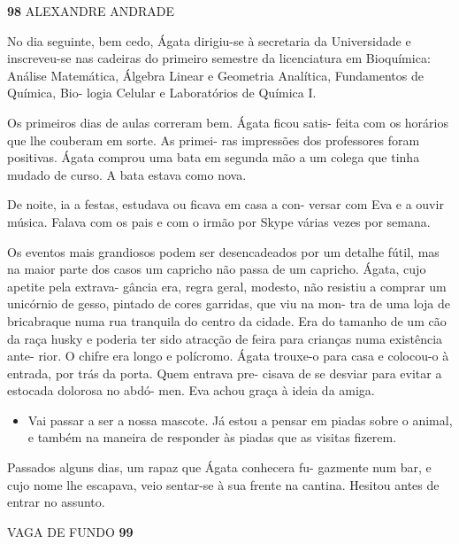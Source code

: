 \textbf{98 }ALEXANDRE ANDRADE

No dia seguinte, bem cedo, Ágata dirigiu-se à secretaria da Universidade
e inscreveu-se nas cadeiras do primeiro semestre da licenciatura em
Bioquímica: Análise Matemática, Álgebra Linear e Geometria Analítica,
Fundamentos de Química, Bio- logia Celular e Laboratórios de Química I.

Os primeiros dias de aulas correram bem. Ágata ficou satis- feita com os
horários que lhe couberam em sorte. As primei- ras impressões dos
professores foram positivas. Ágata comprou uma bata em segunda mão a um
colega que tinha mudado de curso. A bata estava como nova.

De noite, ia a festas, estudava ou ficava em casa a con- versar com Eva
e a ouvir música. Falava com os pais e com o irmão por Skype várias
vezes por semana.

Os eventos mais grandiosos podem ser desencadeados por um detalhe fútil,
mas na maior parte dos casos um capricho não passa de um capricho.
Ágata, cujo apetite pela extrava- gância era, regra geral, modesto, não
resistiu a comprar um unicórnio de gesso, pintado de cores garridas, que
viu na mon- tra de uma loja de bricabraque numa rua tranquila do centro
da cidade. Era do tamanho de um cão da raça husky e poderia ter sido
atracção de feira para crianças numa existência ante- rior. O chifre era
longo e polícromo. Ágata trouxe-o para casa e colocou-o à entrada, por
trás da porta. Quem entrava pre- cisava de se desviar para evitar a
estocada dolorosa no abdó- men. Eva achou graça à ideia da amiga.

\begin{itemize}
\tightlist
\item
  Vai passar a ser a nossa mascote. Já estou a pensar em piadas sobre o
  animal, e também na maneira de responder às piadas que as visitas
  fizerem.
\end{itemize}

Passados alguns dias, um rapaz que Ágata conhecera fu- gazmente num bar,
e cujo nome lhe escapava, veio sentar-se à sua frente na cantina.
Hesitou antes de entrar no assunto.

VAGA DE FUNDO \textbf{99}

